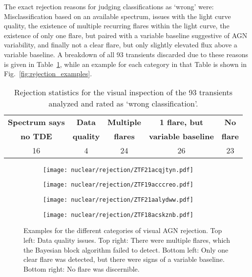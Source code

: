 The exact rejection reasons for judging classifications as `wrong' were: Misclassification based on an available spectrum, issues with the light curve quality, the existence of multiple recurring flares within the light curve, the existence of only one flare, but paired with a variable baseline suggestive of AGN variability, and finally not a clear flare, but only slightly elevated flux above a variable baseline. A breakdown of all 93 transients discarded due to these reasons is given in Table~\ref{tab:rejection_statistics}, while an example for each category in that Table is shown in Fig.~\ref{fig:rejection_examples}.

\begin{table}
  \centering
  \def\arraystretch{1.2}
  \begin{tabular}{c c  c  c c}
    \hline
    \textbf{Spectrum says} & \textbf{Data}    & \textbf{Multiple} & \textbf{1 flare, but}      & \textbf{No}    \\
    \textbf{no TDE}        & \textbf{quality} & \textbf{flares}   & \textbf{variable baseline} & \textbf{flare} \\
    \hline
    \hline
    16                     & 4                & 24                & 26                         & 23             \\
    \hline
  \end{tabular}
  \caption[Visual inspection: rejection statistics]{Rejection statistics for the visual inspection of the 93 transients analyzed and rated as `wrong classification'.}
  \label{tab:rejection_statistics}
\end{table}

\begin{figure}[htbp]
  \centering
  \begin{subfigure}[htb]{0.48\textwidth}
    \texttt{[image: nuclear/rejection/ZTF21acqjtyn.pdf]}
  \end{subfigure}
  \begin{subfigure}[htb]{0.48\textwidth}
    \texttt{[image: nuclear/rejection/ZTF19acccreo.pdf]}
  \end{subfigure}
  \begin{subfigure}[htb]{0.48\textwidth}
    \texttt{[image: nuclear/rejection/ZTF21aalydww.pdf]}
  \end{subfigure}
  \begin{subfigure}[htb]{0.48\textwidth}
    \texttt{[image: nuclear/rejection/ZTF18acskznb.pdf]}
  \end{subfigure}
  \caption[Examples of visual AGN rejection]{Examples for the different categories of visual AGN rejection. Top left: Data quality issues. Top right: There were multiple flares, which the Bayesian block algorithm failed to detect. Bottom left: Only one clear flare was detected, but there were signs of a variable baseline. Bottom right: No flare was discernible.}
\end{figure}

